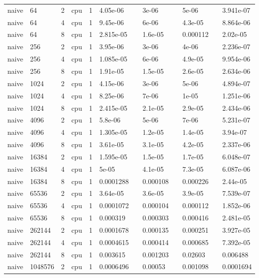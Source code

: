 \begin{tabular}{llllllllllll}
naive & 64 & 2 & cpu & 1 & 4.05e-06 &  & 3e-06 &  & 5e-06 &  & 3.941e-07 \\
naive & 64 & 4 & cpu & 1 & 9.45e-06 &  & 6e-06 &  & 4.3e-05 &  & 8.864e-06 \\
naive & 64 & 8 & cpu & 1 & 2.815e-05 &  & 1.6e-05 &  & 0.000112 &  & 2.02e-05 \\
naive & 256 & 2 & cpu & 1 & 3.95e-06 &  & 3e-06 &  & 4e-06 &  & 2.236e-07 \\
naive & 256 & 4 & cpu & 1 & 1.085e-05 &  & 6e-06 &  & 4.9e-05 &  & 9.954e-06 \\
naive & 256 & 8 & cpu & 1 & 1.91e-05 &  & 1.5e-05 &  & 2.6e-05 &  & 2.634e-06 \\
naive & 1024 & 2 & cpu & 1 & 4.15e-06 &  & 3e-06 &  & 5e-06 &  & 4.894e-07 \\
naive & 1024 & 4 & cpu & 1 & 8.25e-06 &  & 7e-06 &  & 1e-05 &  & 1.251e-06 \\
naive & 1024 & 8 & cpu & 1 & 2.415e-05 &  & 2.1e-05 &  & 2.9e-05 &  & 2.434e-06 \\
naive & 4096 & 2 & cpu & 1 & 5.8e-06 &  & 5e-06 &  & 7e-06 &  & 5.231e-07 \\
naive & 4096 & 4 & cpu & 1 & 1.305e-05 &  & 1.2e-05 &  & 1.4e-05 &  & 3.94e-07 \\
naive & 4096 & 8 & cpu & 1 & 3.61e-05 &  & 3.1e-05 &  & 4.2e-05 &  & 2.337e-06 \\
naive & 16384 & 2 & cpu & 1 & 1.595e-05 &  & 1.5e-05 &  & 1.7e-05 &  & 6.048e-07 \\
naive & 16384 & 4 & cpu & 1 & 5e-05 &  & 4.1e-05 &  & 7.3e-05 &  & 6.087e-06 \\
naive & 16384 & 8 & cpu & 1 & 0.0001288 &  & 0.000108 &  & 0.000226 &  & 2.44e-05 \\
naive & 65536 & 2 & cpu & 1 & 3.64e-05 &  & 3.6e-05 &  & 3.9e-05 &  & 7.539e-07 \\
naive & 65536 & 4 & cpu & 1 & 0.0001072 &  & 0.000104 &  & 0.000112 &  & 1.852e-06 \\
naive & 65536 & 8 & cpu & 1 & 0.000319 &  & 0.000303 &  & 0.000416 &  & 2.481e-05 \\
naive & 262144 & 2 & cpu & 1 & 0.0001678 &  & 0.000135 &  & 0.000251 &  & 3.927e-05 \\
naive & 262144 & 4 & cpu & 1 & 0.0004615 &  & 0.000414 &  & 0.000685 &  & 7.392e-05 \\
naive & 262144 & 8 & cpu & 1 & 0.003615 &  & 0.001203 &  & 0.02603 &  & 0.006488 \\
naive & 1048576 & 2 & cpu & 1 & 0.0006496 &  & 0.00053 &  & 0.001098 &  & 0.0001694 \\

\end{tabular}
